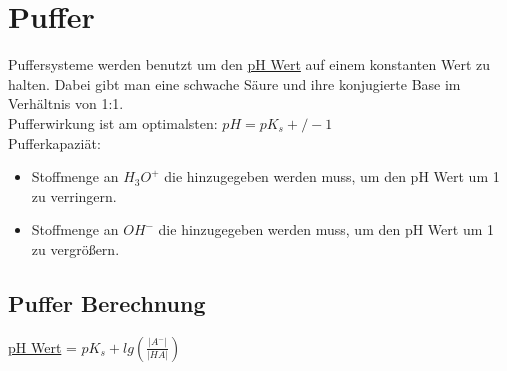 \section{Puffer} \label{sec:puffer}
Puffersysteme werden benutzt um den \hyperref[sec:ph_wert]{pH Wert} auf einem konstanten Wert zu halten.
Dabei gibt man eine schwache Säure und ihre konjugierte Base im Verhältnis von 1:1. \\
Pufferwirkung ist am optimalsten: $pH = pK_s +/- 1$ \\
Pufferkapaziät:
\begin{itemize}
    \item Stoffmenge an $H_3O^+$ die hinzugegeben werden muss, um den pH Wert um 1 zu verringern.
    \item Stoffmenge an $OH^-$ die hinzugegeben werden muss, um den pH Wert um 1 zu vergrößern.
\end{itemize}

\subsection{Puffer Berechnung}
\hyperref[sec:ph_wert]{pH Wert} = $pK_s + lg(\frac{|A^-|}{|HA|})$

